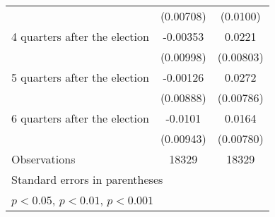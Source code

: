 \begin{table}[htbp]
\begin{tabular}{l*{2}{c}}
                    &   (0.00708)         &    (0.0100)         \\
[1em]
 4 quarters after the election&    -0.00353         &      0.0221\sym{**} \\
                    &   (0.00998)         &   (0.00803)         \\
[1em]
 5 quarters after the election&    -0.00126         &      0.0272\sym{***}\\
                    &   (0.00888)         &   (0.00786)         \\
[1em]
 6 quarters after the election&     -0.0101         &      0.0164\sym{*}  \\
                    &   (0.00943)         &   (0.00780)         \\
\hline
Observations        &       18329         &       18329         \\
\hline\hline
\multicolumn{3}{l}{\footnotesize Standard errors in parentheses}\\
\multicolumn{3}{l}{\footnotesize \sym{*} \(p<0.05\), \sym{**} \(p<0.01\), \sym{***} \(p<0.001\)}\\
\end{tabular}
\end{table}
